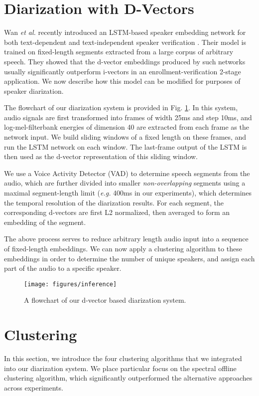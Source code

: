 \documentclass{article}
\begin{document}
\section{Diarization with D-Vectors}
\label{sec:dvector}
Wan \textit{et al.} recently introduced an LSTM-based \cite{hochreiter1997long}
speaker embedding network for both text-dependent and text-independent speaker verification \cite{ge2e}. Their model is trained on fixed-length segments extracted from a large corpus of arbitrary speech. They showed that the d-vector embeddings
produced by such networks usually significantly outperform i-vectors in an enrollment-verification 2-stage application. We now describe how this model can be modified for purposes of speaker diarization.

The flowchart of our diarization system is provided in Fig. \ref{fig:inference}.
In this system, audio signals are first transformed into frames of width 25ms and step 10ms,
and log-mel-filterbank energies of dimension 40 are extracted from each frame as the network input.
We build sliding windows of a fixed length on these frames, and run the LSTM network
on each window.
The last-frame output of the LSTM is then used as the d-vector representation of this sliding window.

We use a Voice Activity Detector (VAD) to determine speech segments from the audio, which are further divided into smaller \textit{non-overlapping} segments using a maximal segment-length limit (\textit{e.g.} 400ms in our experiments), which determines the temporal resolution of the diarization results. For each segment, the corresponding d-vectors are first
L2 normalized, then averaged to form an embedding of the segment.

The above process serves to reduce arbitrary length audio input into a sequence of fixed-length embeddings. We can now apply a clustering algorithm to these embeddings in order to determine the number of unique speakers, and assign each part of the audio to a specific speaker.

\begin{figure}
  \centering
    \texttt{[image: figures/inference]}
  \caption{A flowchart of our d-vector based diarization system.}
  \label{fig:inference}
  \vspace{-10pt}
\end{figure}

\section{Clustering}
\label{sec:clustering}
In this section, we introduce the four clustering algorithms that we integrated into our diarization system. We place particular focus on the spectral offline clustering algorithm, which significantly outperformed the alternative approaches across experiments.
\end{document}
